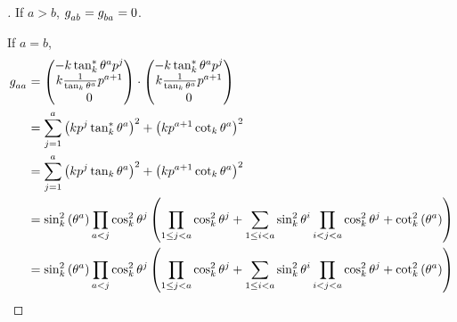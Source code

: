 \documentclass[stu, babel, american, biblatex, a4paper, leqno, draftall]{apa7}
\begin{document}
\begin{proof}[]
    If $a>b$, $\tensor{g}{_a_b}=\tensor{g}{_b_a}=0$.

    If $a=b$,
    \begin{align*}
        \tensor{g}{_a_a}
         & =\begin{pmatrix}
                -k\tan_k^\ast\tensor{\theta}{^a}\tensor{p}{^j}         \\
                k\frac{1}{\tan_k\tensor{\theta}{^a}}\tensor{p}{^{a+1}} \\
                0
            \end{pmatrix}\cdot\begin{pmatrix}
                                  -k\tan_k^\ast\tensor{\theta}{^a}\tensor{p}{^j}         \\
                                  k\frac{1}{\tan_k\tensor{\theta}{^a}}\tensor{p}{^{a+1}} \\
                                  0
                              \end{pmatrix} \\
         & =
        \sum_{j=1}^{a}{\left(k\tensor{p}{^j}\tan_k^\ast\tensor{\theta}{^a}\right)^2}
        +\left(k\tensor{p}{^{a+1}}\cot_k\tensor{\theta}{^a}\right)^2                                                       \\
         & =
        \sum_{j=1}^{a}{\left(k\tensor{p}{^j}\tan_k\tensor{\theta}{^a}\right)^2}
        +\left(k\tensor{p}{^{a+1}}\cot_k\tensor{\theta}{^a}\right)^2                                                       \\
         & =
        \sin_k^2\left(\tensor{\theta}{^a}\right)
        \prod_{a<j}{\cos_k^2\tensor{\theta}{^j}}
        \left(
        \prod_{1\le j<a}{\cos_k^2\tensor{\theta}{^j}}
        + \sum_{1\le i<a}{
            \sin_k^2{\tensor{\theta}{^{i}}}\prod_{i<j<a}{\cos_k^2\tensor{\theta}{^j}}
        }
        +\cot_k^2\left(\tensor{\theta}{^a}\right)
        \right)                                                                                                            \\
         & =
        \sin_k^2\left(\tensor{\theta}{^a}\right)
        \prod_{a<j}{\cos_k^2\tensor{\theta}{^j}}
        \left(
        \prod_{1\le j<a}{\cos_k^2\tensor{\theta}{^j}}
        + \sum_{1\le i<a}{
            \sin_k^2{\tensor{\theta}{^{i}}}\prod_{i<j<a}{\cos_k^2\tensor{\theta}{^j}}
        }
        +\cot_k^2\left(\tensor{\theta}{^a}\right)
        \right)                                                                                                            \\

\end{align*}
\end{proof}
\end{document}
